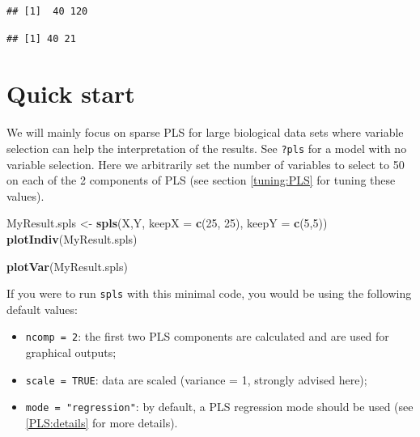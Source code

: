 \documentclass[]{book}
\newenvironment{Shaded}{\begin{snugshade}}{\end{snugshade}}
\newcommand{\DataTypeTok}[1]{\textcolor[rgb]{0.13,0.29,0.53}{#1}}
\newcommand{\DecValTok}[1]{\textcolor[rgb]{0.00,0.00,0.81}{#1}}
\newcommand{\KeywordTok}[1]{\textcolor[rgb]{0.13,0.29,0.53}{\textbf{#1}}}
\newcommand{\NormalTok}[1]{#1}
\newcommand{\StringTok}[1]{\textcolor[rgb]{0.31,0.60,0.02}{#1}}
\providecommand{\tightlist}{%
  \setlength{\itemsep}{0pt}\setlength{\parskip}{0pt}}
\begin{document}
\begin{verbatim}
## [1]  40 120
\end{verbatim}

\begin{verbatim}
## [1] 40 21
\end{verbatim}

\hypertarget{quick-start-2}{%
\section{Quick start}\label{quick-start-2}}

We will mainly focus on sparse PLS for large biological data sets where variable selection can help the interpretation of the results. See \texttt{?pls} for a model with no variable selection. Here we arbitrarily set the number of variables to select to 50 on each of the 2 components of PLS (see section \ref{tuning:PLS} for tuning these values).

\begin{Shaded}
\begin{Highlighting}[]
\NormalTok{MyResult.spls <-}\StringTok{ }\KeywordTok{spls}\NormalTok{(X,Y, }\DataTypeTok{keepX =} \KeywordTok{c}\NormalTok{(}\DecValTok{25}\NormalTok{, }\DecValTok{25}\NormalTok{), }\DataTypeTok{keepY =} \KeywordTok{c}\NormalTok{(}\DecValTok{5}\NormalTok{,}\DecValTok{5}\NormalTok{))  }
\KeywordTok{plotIndiv}\NormalTok{(MyResult.spls)                                      }
\end{Highlighting}
\end{Shaded}

\begin{Shaded}
\begin{Highlighting}[]
\KeywordTok{plotVar}\NormalTok{(MyResult.spls)                                        }
\end{Highlighting}
\end{Shaded}

If you were to run \texttt{spls} with this minimal code, you would be using the following default values:

\begin{itemize}
\tightlist
\item
  \texttt{ncomp\ =\ 2}: the first two PLS components are calculated and are used for graphical outputs;
\item
  \texttt{scale\ =\ TRUE}: data are scaled (variance = 1, strongly advised here);
\item
  \texttt{mode\ =\ "regression"}: by default, a PLS regression mode should be used (see \ref{PLS:details} for more details).
\end{itemize}
\end{document}
